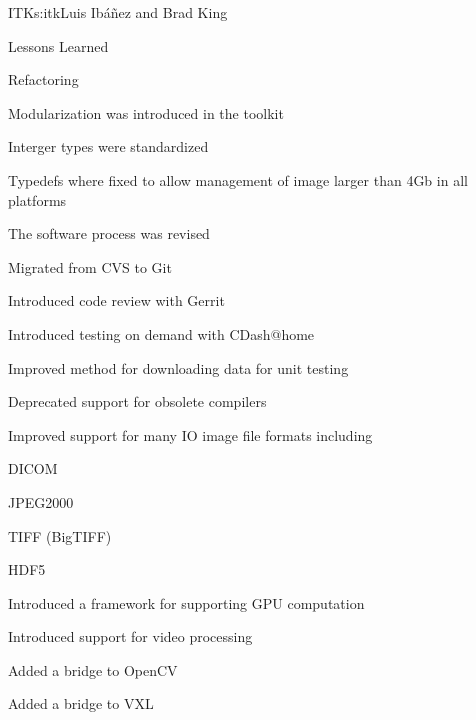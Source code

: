 \begin{aosachapter}{ITK}{s:itk}{Luis Ib\'{a}\~{n}ez and Brad King}
\begin{aosasect1}{Lessons Learned}
\begin{aosasect2}{Refactoring}
\begin{aosaitemize}
\item Modularization was introduced in the toolkit
\item Interger types were standardized
\item Typedefs where fixed to allow management of image larger than 4Gb in all platforms
\item The software process was revised
  \begin{aosaitemize2}
    \item Migrated from CVS to Git
    \item Introduced code review with Gerrit
    \item Introduced testing on demand with CDash@home
    \item Improved method for downloading data for unit testing
  \end{aosaitemize2}
\item Deprecated support for obsolete compilers
\item Improved support for many IO image file formats including
  \begin{aosaitemize2}
    \item DICOM
    \item JPEG2000
    \item TIFF (BigTIFF)
    \item HDF5
  \end{aosaitemize2}
\item Introduced a framework for supporting GPU computation
\item Introduced support for video processing
  \begin{aosaitemize2}
    \item Added a bridge to OpenCV
    \item Added a bridge to VXL
  \end{aosaitemize2}

\end{aosaitemize}


\end{aosasect2}
\end{aosasect1}
\end{aosachapter}

